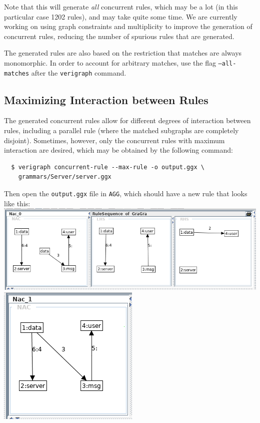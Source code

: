 \documentclass[12pt]{article}
\newenvironment{tutorialstep}
	{\hspace{-\parindent}\begin{minipage}{\textwidth}}
    {\vspace{.3cm}\end{minipage}}
\begin{document}
Note that this will generate \emph{all} concurrent rules, which may be a lot (in this particular case 1202 rules), and may take quite some time. We are currently working on using graph constraints and multiplicity to improve the generation of concurrent rules, reducing the number of spurious rules that are generated.

The generated rules are also based on the restriction that matches are always monomorphic. In order to account for arbitrary matches, use the flag \texttt{--all-matches} after the \texttt{verigraph} command.

\subsection{Maximizing Interaction between Rules}

The generated concurrent rules allow for different degrees of interaction between rules, including a parallel rule (where the matched subgraphs are completely disjoint). Sometimes, however, only the concurrent rules with maximum interaction are desired, which may be obtained by the following command:

\begin{verbatim}
  $ verigraph concurrent-rule --max-rule -o output.ggx \
    grammars/Server/server.ggx
\end{verbatim}

\begin{tutorialstep}
  Then open the \texttt{output.ggx} file in \texttt{AGG}, which should have a new rule that looks like this:\\

  \noindent
  \includegraphics[scale = 0.5]{img/concurrent-rules/rule-sequence_04a.png}\\
  \noindent
  \includegraphics[scale = 0.5]{img/concurrent-rules/rule-sequence_04b.png}\\
\end{tutorialstep}
\end{document}
